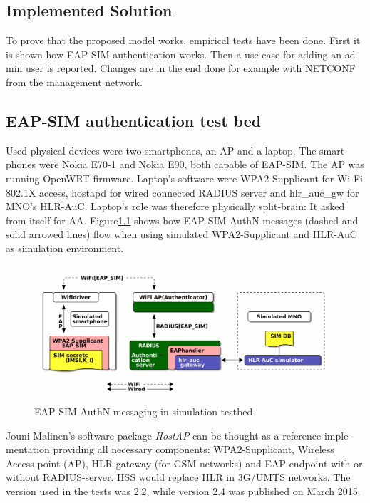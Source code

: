 \documentclass[12pt,a4paper,english]{tutthesis}
\begin{document}
\begin{otherlanguage}{english}
\chapter{Implemented Solution}
\label{sec-5}


To prove that the proposed model works, empirical tests have been done.
First it is shown how EAP-SIM authentication works. Then a use case for
adding an admin user is reported. Changes are in the end done 
for example with NETCONF from the management network.

\section{EAP-SIM authentication test bed}
\label{sec-5-1}



Used physical devices were two smartphones, an AP and a laptop.
The smartphones were Nokia E70-1 and Nokia E90, both capable of EAP-SIM.
The AP was running OpenWRT firmware.  
Laptop's software were WPA2-Supplicant for Wi-Fi 802.1X access,
hostapd for wired connected RADIUS server and hlr\_auc\_gw for MNO's
HLR-AuC. Laptop's role was therefore physically split-brain: It asked from itself for AA. 
Figure\ref{eap-sim-testbed} shows how EAP-SIM AuthN messages (dashed
and solid arrowed lines) flow when using 
simulated WPA2-Supplicant and HLR-AuC as simulation environment.

\begin{figure}[htb]
\centering
\includegraphics[width=.9\linewidth]{demoinfra.png}
\caption{\label{eap-sim-testbed}EAP-SIM AuthN messaging in simulation testbed}
\end{figure}




Jouni Malinen's software package \emph{HostAP}\cite{hostapd} can be thought
 as a reference
implementation providing all necessary components: WPA2-Supplicant, Wireless
Access point (AP), HLR-gateway (for GSM networks) and EAP-endpoint with
or without RADIUS-server. HSS would replace HLR in 3G/UMTS networks.
The version used in the tests was 2.2, while version
2.4 was published on March 2015.


\end{otherlanguage}
\end{document}
